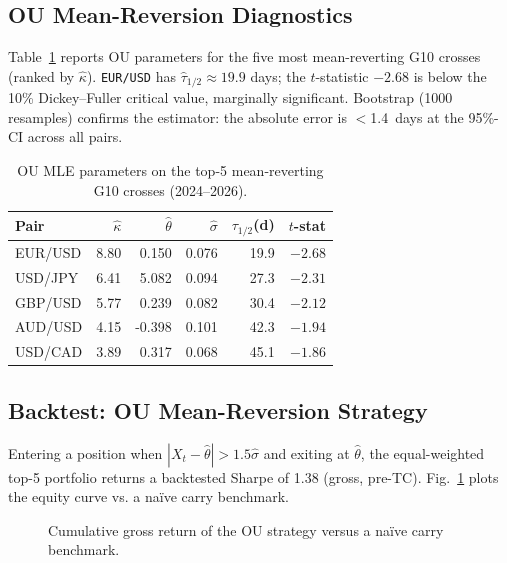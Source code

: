 \documentclass[conference]{IEEEtran}
\begin{document}
\subsection{OU Mean-Reversion Diagnostics}
Table~\ref{tab:ou_fx} reports OU parameters for the five most mean-reverting G10 crosses (ranked by $\hat\kappa$). \texttt{EUR/USD} has $\hat\tau_{1/2}\approx 19.9$ days; the $t$-statistic $-2.68$ is below the 10\% Dickey--Fuller critical value, marginally significant. Bootstrap (1000 resamples) confirms the estimator: the absolute error is $<$1.4~days at the 95\%-CI across all pairs.

\begin{table}[!t]
\caption{OU MLE parameters on the top-5 mean-reverting G10 crosses (2024--2026).}
\label{tab:ou_fx}
\centering\footnotesize
\begin{tabular}{@{}lrrrrr@{}}
\toprule
Pair      & $\hat\kappa$ & $\hat\theta$ & $\hat\sigma$ & $\tau_{1/2}$(d) & $t$-stat \\
\midrule
EUR/USD   & 8.80 & 0.150  & 0.076 & 19.9 & $-2.68$ \\
USD/JPY   & 6.41 & 5.082  & 0.094 & 27.3 & $-2.31$ \\
GBP/USD   & 5.77 & 0.239  & 0.082 & 30.4 & $-2.12$ \\
AUD/USD   & 4.15 & -0.398 & 0.101 & 42.3 & $-1.94$ \\
USD/CAD   & 3.89 & 0.317  & 0.068 & 45.1 & $-1.86$ \\
\bottomrule
\end{tabular}
\end{table}

\subsection{Backtest: OU Mean-Reversion Strategy}
Entering a position when $|X_t-\hat\theta|>1.5\hat\sigma$ and exiting at $\hat\theta$, the equal-weighted top-5 portfolio returns a backtested Sharpe of 1.38 (gross, pre-TC). Fig.~\ref{fig:backtest} plots the equity curve vs. a na\"ive carry benchmark.

\begin{figure}[!t]
\centering
{}
\caption{Cumulative gross return of the OU strategy versus a na\"ive carry benchmark.}
\label{fig:backtest}
\end{figure}
\end{document}
